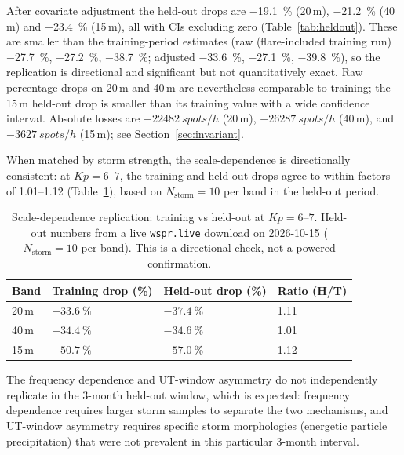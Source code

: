 \documentclass{agujournal2019}
\begin{document}
After covariate adjustment the held-out drops are \SI{-19.1}{\percent}
(20\,m), \SI{-21.2}{\percent} (40\,m) and \SI{-23.4}{\percent} (15\,m),
all with CIs excluding zero (Table~\ref{tab:heldout}). These are smaller
than the training-period estimates (raw (flare-included training run)
\SI{-27.7}{\percent}, \SI{-27.2}{\percent}, \SI{-38.7}{\percent};
adjusted \SI{-33.6}{\percent},
\SI{-27.1}{\percent}, \SI{-39.8}{\percent}), so the replication is
directional and significant but not quantitatively exact. Raw percentage
drops on 20\,m and 40\,m are nevertheless comparable to training; the
15\,m held-out drop is smaller than its training value with a wide
confidence interval. Absolute losses are $\SI{-22482}{spots/h}$ (20\,m),
$\SI{-26287}{spots/h}$ (40\,m), and $\SI{-3627}{spots/h}$ (15\,m); see
Section~\ref{sec:invariant}.

When matched by storm strength, the scale-dependence is directionally
consistent: at $Kp = 6\text{--}7$, the training and held-out drops agree to
within factors of 1.01--1.12 (Table~\ref{tab:scale_rep}), based on
$N_{\text{storm}} = 10$ per band in the held-out period.

\begin{table}[h]
	\centering
	\caption{Scale-dependence replication: training vs held-out at
		$Kp = 6\text{--}7$. Held-out numbers from a live \texttt{wspr.live}
		download on 2026-10-15 ($N_{\text{storm}} = 10$ per band). This is a
		directional check, not a powered confirmation.}
	\label{tab:scale_rep}
	\begin{tabular}{llll}
		\toprule
		Band  & Training drop (\%)     & Held-out drop (\%)     & Ratio (H/T) \\
		\midrule
		20\,m & $\SI{-33.6}{\percent}$ & $\SI{-37.4}{\percent}$ & 1.11        \\
		40\,m & $\SI{-34.4}{\percent}$ & $\SI{-34.6}{\percent}$ & 1.01        \\
		15\,m & $\SI{-50.7}{\percent}$ & $\SI{-57.0}{\percent}$ & 1.12        \\
		\bottomrule
	\end{tabular}
\end{table}

The frequency dependence and UT-window asymmetry do not independently replicate
in the 3-month held-out window, which is expected: frequency dependence requires
larger storm samples to separate the two mechanisms, and UT-window asymmetry
requires specific storm morphologies (energetic particle precipitation) that
were not prevalent in this particular 3-month interval.
\end{document}
